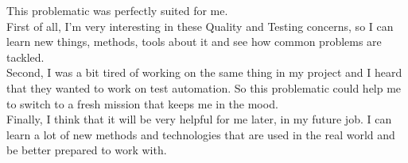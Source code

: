This problematic was perfectly suited for me. \\
First of all, I'm very interesting in these Quality and Testing concerns,
so I can learn new things, methods, tools about it and see how common
problems are tackled. \\
Second, I was a bit tired of working on the same thing in my project and
I heard that they wanted to work on test automation.
So this problematic could help me to switch to a fresh mission that keeps
me in the mood. \\
Finally, I think that it will be very helpful for me later, in my future
job.
I can learn a lot of new methods and technologies that are used in the
real world and be better prepared to work with.